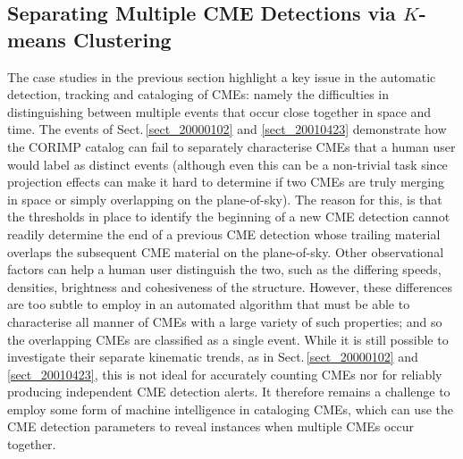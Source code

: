 \documentclass[referee,a4paper,12pt,traditabstract]{swsc}
\begin{document}
\begin{linenumbers}
\section{Separating Multiple CME Detections via $K$-means Clustering}
\label{sect_clusters}


The case studies in the previous section highlight a key issue in the automatic detection, tracking and cataloging of CMEs: namely the difficulties in distinguishing between multiple events that occur close together in space and time. The events of Sect.\,\ref{sect_20000102} and \ref{sect_20010423} demonstrate how the CORIMP catalog can fail to separately characterise CMEs that a human user would label as distinct events (although even this can be a non-trivial task since projection effects can make it hard to determine if two CMEs are truly merging in space or simply overlapping on the plane-of-sky). The reason for this, is that the thresholds in place to identify the beginning of a new CME detection cannot readily determine the end of a previous CME detection whose trailing material overlaps the subsequent CME material on the plane-of-sky. Other observational factors can help a human user distinguish the two, such as the differing speeds, densities, brightness and cohesiveness of the structure. However, these differences are too subtle to employ in an automated algorithm that must be able to characterise all manner of CMEs with a large variety of such properties; and so the overlapping CMEs are classified as a single event. While it is still possible to investigate their separate kinematic trends, as in Sect.\,\ref{sect_20000102} and \ref{sect_20010423}, this is not ideal for accurately counting CMEs nor for reliably producing independent CME detection alerts. It therefore remains a challenge to employ some form of machine intelligence in cataloging CMEs, which can use the CME detection parameters to reveal instances when multiple CMEs occur together.



\end{linenumbers}
\end{document}
